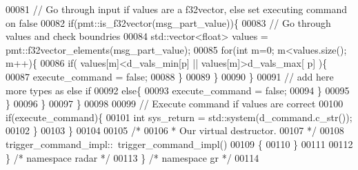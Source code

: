 \begin{DoxyCode}
00081                     \textcolor{comment}{// Go through input if values are a f32vector, else set executing command on false}
00082                     \textcolor{keywordflow}{if}(pmt::is\_f32vector(msg\_part\_value))\{
00083                         \textcolor{comment}{// Go through values and check boundries}
00084                         std::vector<float> values = pmt::f32vector\_elements(msg\_part\_value);
00085                         \textcolor{keywordflow}{for}(\textcolor{keywordtype}{int} m=0; m<values.size(); m++)\{
00086                             \textcolor{keywordflow}{if}( values[m]<d_vals_min[p] || values[m]>d_vals_max[
      p] )\{
00087                                 execute\_command = \textcolor{keyword}{false};
00088                             \}
00089                         \}
00090                     \}
00091                     \textcolor{comment}{// add here more types as else if}
00092                     \textcolor{keywordflow}{else}\{
00093                         execute\_command = \textcolor{keyword}{false};
00094                     \}
00095                 \}
00096             \}
00097         \}
00098         
00099         \textcolor{comment}{// Execute command if values are correct}
00100         \textcolor{keywordflow}{if}(execute\_command)\{
00101             \textcolor{keywordtype}{int} sys\_return = std::system(d_command.c\_str());
00102         \}
00103     \}
00104 
00105     \textcolor{comment}{/*}
00106 \textcolor{comment}{     * Our virtual destructor.}
00107 \textcolor{comment}{     */}
00108     trigger_command_impl::~trigger_command_impl()
00109     \{
00110     \}
00111 
00112   \} \textcolor{comment}{/* namespace radar */}
00113 \} \textcolor{comment}{/* namespace gr */}
00114 
\end{DoxyCode}
